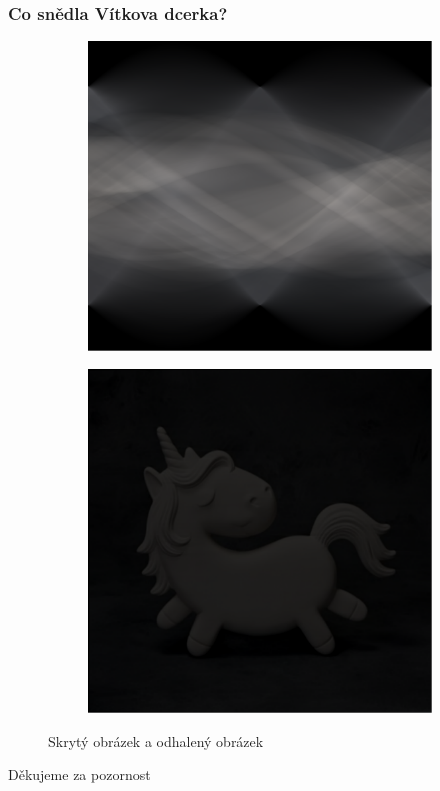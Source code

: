 \documentclass{beamer}
\begin{document}
\begin{frame}
\frametitle{Co snědla Vítkova dcerka?}

\begin{figure}
\centering
\begin{subfigure}{.5\textwidth}
  \centering
  \includegraphics[width=.8\linewidth]{secret-radon.pdf}
  \label{fig:sub1}
\end{subfigure}%
\begin{subfigure}{.5\textwidth}
  \centering
  \includegraphics[width=.8\linewidth]{unicorn.pdf}
  \label{fig:sub2}
\end{subfigure}
\caption{Skrytý obrázek a odhalený obrázek}
\label{fig:test}
\end{figure}

\end{frame}
\begin{frame}
\begin{center}
\begin{huge}
Děkujeme za pozornost
\end{huge}

\end{center}

\end{frame}
\end{document}
